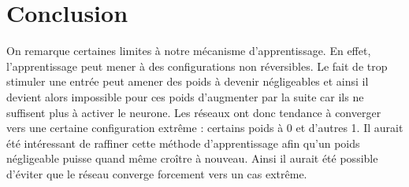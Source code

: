 \section{Conclusion}
On remarque certaines limites à notre mécanisme d'apprentissage. En effet,
l'apprentissage peut mener à des configurations non réversibles. Le fait de
trop stimuler une entrée peut amener des poids à devenir négligeables et ainsi
il devient alors impossible pour ces poids d'augmenter par la suite car ils
ne suffisent plus à activer le neurone. Les réseaux ont donc tendance à converger
vers une certaine configuration extrême : certains poids à 0 et d'autres 1. Il
aurait été intéressant de raffiner cette méthode d'apprentissage afin qu'un 
poids négligeable puisse quand même croître à nouveau. Ainsi il aurait
été possible d'éviter que le réseau converge forcement vers un cas extrême.
